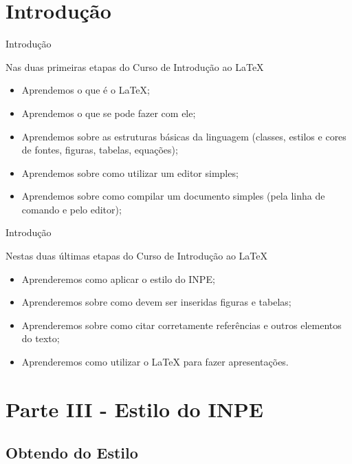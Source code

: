 \documentclass[10pt]{beamer}
\begin{document}
\section{Introdução}

\begin{frame}{Introdução}
\begin{block}{Nas duas primeiras etapas do Curso de Introdução ao \LaTeX{}}
\begin{itemize}[label=\textbullet]
    \pause
    \item Aprendemos o que é o \LaTeX{};
    \pause
    \item Aprendemos o que se pode fazer com ele;
    \pause
    \item Aprendemos sobre as estruturas básicas da linguagem (classes, estilos e cores de fontes, figuras, tabelas, equações);
    \pause
    \item Aprendemos sobre como utilizar um editor simples;
    \pause
    \item Aprendemos sobre como compilar um documento simples (pela linha de comando e pelo editor);
\end{itemize}
\end{block}
\end{frame}

\begin{frame}{Introdução}
\begin{block}{Nestas duas últimas etapas do Curso de Introdução ao \LaTeX{}}
\begin{itemize}[label=\textbullet]
    \pause
    \item Aprenderemos como aplicar o estilo do INPE;
    \pause
    \item Aprenderemos sobre como devem ser inseridas figuras e tabelas;
    \pause
    \item Aprenderemos sobre como citar corretamente referências e outros elementos do texto;
    \pause
    \item Aprenderemos como utilizar o \LaTeX{} para fazer apresentações.
\end{itemize}
\end{block}
\end{frame}

\section{Parte III - Estilo do INPE}

\subsection{Obtendo do Estilo}
\end{document}
